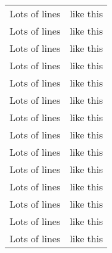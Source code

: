 \documentclass[a4paper, 12pt]{article}
\begin{document}
\begin{longtable}[c]{| c | c |}
    Lots of lines & like this\\
    Lots of lines & like this\\
    Lots of lines & like this\\
    Lots of lines & like this\\
    Lots of lines & like this\\
    Lots of lines & like this\\
    Lots of lines & like this\\
    Lots of lines & like this\\
    Lots of lines & like this\\
    Lots of lines & like this\\
    Lots of lines & like this\\
    Lots of lines & like this\\
    Lots of lines & like this\\
    Lots of lines & like this\\
 \end{longtable}
\end{document}
